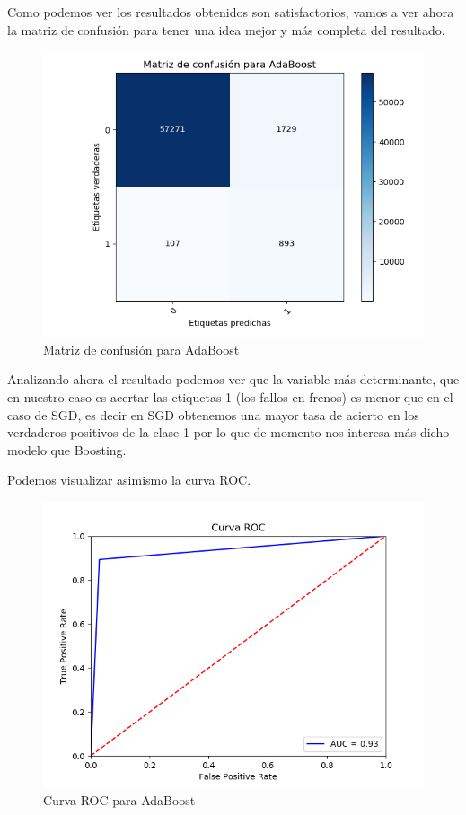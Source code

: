 Como podemos ver los resultados obtenidos son satisfactorios, vamos a ver ahora la matriz de confusión para tener una idea mejor y más completa del resultado.

\begin{figure}[H] %
	\centering
	\includegraphics[scale=0.6]{AdaBoostConf.png}  %
	\caption{Matriz de confusión para AdaBoost} 
	\label{fig:conf-adaboost}
\end{figure}

Analizando ahora el resultado podemos ver que la variable más determinante, que en nuestro caso es acertar las etiquetas 1 (los fallos en frenos) es menor que en el caso de SGD, es decir en SGD obtenemos una mayor tasa de acierto en los verdaderos positivos de la clase 1 por lo que de momento nos interesa más dicho modelo que Boosting.

Podemos visualizar asimismo la curva ROC.

\begin{figure}[H] %
	\centering
	\includegraphics[scale=0.6]{ROC-AB.png}  %
	\caption{Curva ROC para AdaBoost} 
	\label{fig:roc-ab}
\end{figure}

